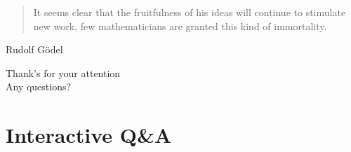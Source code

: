 \documentclass[10pt]{beamer}
\begin{document}
\appendix
\nologo
\begin{frame}[standout]
  \begin{quote}
    \begin{center}
      It seems clear that the fruitfulness of his ideas will continue to stimulate new work, few mathematicians are granted this kind of immortality.
    \end{center}
  \end{quote}
  \centering Rudolf Gödel
\end{frame}

\begin{frame}[standout]
Thank's for your attention \\ Any questions?
\end{frame}

\section{Interactive Q\&A}

\end{document}
